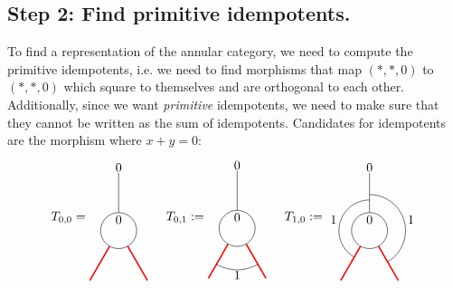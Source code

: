 \subsection*{Step 2: Find primitive idempotents.} To find a representation of the annular category, we need to compute the primitive idempotents, i.e. we need to find morphisms that map $(*,*,0)$ to $(*,*,0)$ which square to themselves and are orthogonal to each other. Additionally, since we want \emph{primitive} idempotents, we need to make sure that they cannot be written as the sum of idempotents.
Candidates for idempotents are the morphism where $x+y=0$:
	\begin{equation}
		T_{0,0}=
		\begin{tikzpicture}[scale=1,baseline=(current bounding box.center)]
			\draw (0,0) circle (0.5cm);
			\draw[red,line width=0.4mm]
			\foreach \a in {-60, -120} {
				(\a:0.5) -- (\a:1.6)
			};
			\draw[] (90:0.5) -- (90:1.6);
			\node at (90:.3cm){$0$};\node at (90:1.75cm){$0$};
		\end{tikzpicture}
		\hspace{5mm}
		T_{0,1}:=
		\begin{tikzpicture}[scale=1,baseline=(current bounding box.center)]
		\draw (0,0) circle (0.5cm);
		\draw[red,line width=0.4mm]
		\foreach \a in {-60, -120} {
			(\a:0.5) -- (\a:1.6)
		};
		\draw ([shift=(-120:1.15cm)]0,0) arc (-120:-60:1.15cm);
		\draw[] (90:0.5) -- (90:1.6);
		\node at (90:.3cm){$0$};\node at (90:1.75cm){$0$};
		\node at (0,-1.3) {$1$};
		\end{tikzpicture}
		\hspace{5mm}
		T_{1,0}:=
		\begin{tikzpicture}[scale=1,baseline=(current bounding box.center)]
		\draw (0,0) circle (0.5cm);
		\draw[red,line width=0.4mm]
		\foreach \a in {-60, -120} {
			(\a:0.5) -- (\a:1.6)
		};
		\draw ([shift=(-60:1cm)]0,0) arc (-60:90:1cm);
		\draw ([shift=(240:0.85cm)]0,0) arc (240:90:0.85cm);
		\draw[] (90:0.5) -- (90:1.6);
		\node at (90:.3cm){$0$};\node at (90:1.75cm){$0$};
		\node at (-1,0.3) {$1$};
		\node at (1.15,0.3) {$1$};

\end{tikzpicture}
\end{equation}

